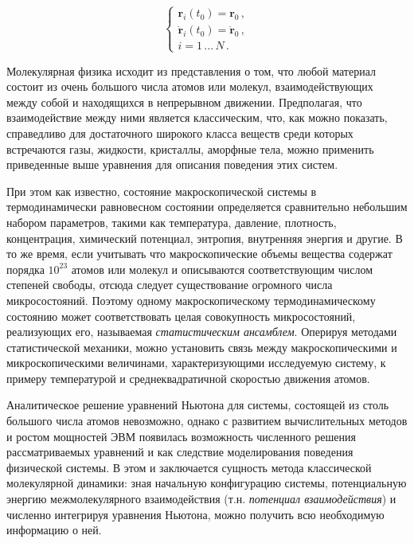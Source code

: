 \begin{equation}
    \begin{cases}
        \mathbf{r}_{i}(t_0) = \mathbf{r}_0\, , \\
        \mathbf{\dot{r}}_{i}(t_0) = \mathbf{\dot{r}}_0\, , \\
        i = 1\,...\,N\,.
        \label{eq2.1.4}
    \end{cases}
\end{equation}

\par Молекулярная физика исходит из представления о том, что любой материал состоит из очень большого числа атомов или молекул, взаимодействующих между собой и находящихся в непрерывном движении. Предполагая, что взаимодействие между ними является классическим, что, как можно показать, справедливо для достаточного широкого класса веществ среди которых встречаются газы, жидкости, кристаллы, аморфные тела, можно применить приведенные выше уравнения для описания поведения этих систем.

\par При этом как известно, состояние макроскопической системы в термодинамически равновесном состоянии определяется сравнительно небольшим набором параметров, такими как температура, давление, плотность, концентрация, химический потенциал, энтропия, внутренняя энергия и другие. В то же время, если учитывать что макроскопические объемы вещества содержат порядка $10^{23}$ атомов или молекул и описываются соответствующим числом степеней свободы, отсюда следует существование огромного числа микросостояний. Поэтому одному макроскопическому термодинамическому состоянию может соответствовать целая совокупность микросостояний, реализующих его, называемая \textit{статистическим ансамблем}. Оперируя методами статистической механики, можно установить связь между макроскопическими и микроскопическими величинами, характеризующими исследуемую систему, к примеру температурой и среднеквадратичной скоростью движения атомов.

\par Аналитическое решение уравнений Ньютона для системы, состоящей из столь большого числа атомов невозможно, однако с развитием вычислительных методов и ростом мощностей ЭВМ появилась возможность численного решения рассматриваемых уравнений и как следствие моделирования поведения физической системы. В этом и заключается сущность метода классической молекулярной динамики: зная начальную конфигурацию системы, потенциальную энергию межмолекулярного взаимодействия (т.н. \textit{потенциал взаимодействия}) и численно интегрируя уравнения Ньютона, можно получить всю необходимую информацию о ней. 

